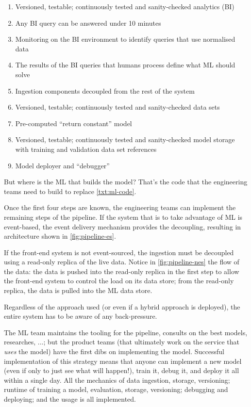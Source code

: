 \begin{enumerate}
  \item Versioned, testable; continuously tested and sanity-checked analytics (BI)  
  \item Any BI query can be answered under 10 minutes
  \item Monitoring on the BI environment to identify queries that use normalised data
  \item The results of the BI queries that humans process define what ML should solve
  \item Ingestion components decoupled from the rest of the system
  \item Versioned, testable; continuously tested and sanity-checked data sets 
  \label{txt:ml-code}\item Pre-computed ``return constant'' model
  \item Versioned, testable; continuously tested and sanity-checked model storage with training and validation data set references
  \item Model deployer and ``debugger''
\end{enumerate}

But where is the ML that builds the model? That's the code that the engineering teams need to build to replace \autoref{txt:ml-code}. 

Once the first four steps are known, the engineering teams can implement the remaining steps of the pipeline. If the system that is to take advantage of ML is event-based, the event delivery mechanism provides the decoupling, resulting in architecture shown in \autoref{fig:pipeline-es}.


If the front-end system is not event-sourced, the ingestion must be decoupled using a read-only replica of the live data. Notice in \autoref{fig:pipeline-nes} the flow of the data: the data is pushed into the read-only replica in the first step to allow the front-end system to control the load on its data store; from the read-only replica, the data is pulled into the ML data store. 


Regardless of the approach used (or even if a hybrid approach is deployed), the entire system has to be aware of any back-pressure.

The ML team maintains the tooling for the pipeline, consults on the best models, researches, ...; but the product teams (that ultimately work on the service that \emph{uses} the model) have the first dibs on implementing the model. Successful implementation of this strategy means that anyone can implement a new model (even if only to just see what will happen!), train it, debug it, and deploy it all within a single day. All the mechanics of data ingestion, storage, versioning; runtime of training a model, evaluation, storage, versioning; debugging and deploying; and the usage is all implemented. 


